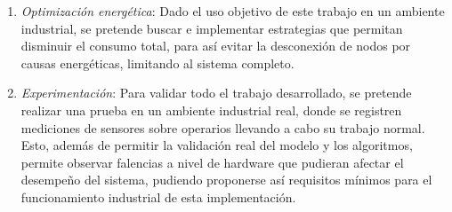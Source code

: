 \documentclass[10pt,preprint,onecolumn]{paper}
\begin{document}
\begin{enumerate}
\begin{enumerate}
	\item \emph{Optimización energética}: Dado el uso objetivo de este trabajo en un ambiente industrial, se pretende buscar e implementar estrategias que permitan disminuir el consumo total, para así evitar la desconexión de nodos por causas energéticas, limitando al sistema completo.
	
	\item \emph{Experimentación}: Para validar todo el trabajo desarrollado, se pretende realizar una prueba en un ambiente industrial real, donde se registren mediciones de sensores sobre operarios llevando a cabo su trabajo normal. Esto, además de permitir la validación real del modelo y los algoritmos, permite observar falencias a nivel de hardware que pudieran afectar el desempeño del sistema, pudiendo proponerse así requisitos mínimos para el funcionamiento industrial de esta implementación.

		
\end{enumerate}

\end{enumerate}


\clearpage



\end{document}
